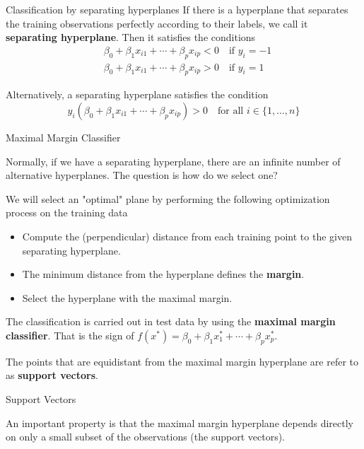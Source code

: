 \documentclass{beamer}
\begin{document}
\begin{frame}{Classification by separating hyperplanes}
	If there is a hyperplane that separates the training observations perfectly according to their labels, we call it {\bf separating hyperplane}.  Then it satisfies the conditions
	\begin{equation*}
		\begin{split}
			&\beta_0 + \beta_1 x_{i1} + \cdots + \beta_p x_{ip}<0  \quad \textrm{if } y_i = -1\\
			&\beta_0 + \beta_1 x_{i1}+ \cdots + \beta_p x_{ip}>0  \quad \textrm{if } y_i =1
		\end{split}
	\end{equation*}

Alternatively, a separating hyperplane satisfies the condition
\begin{equation*}
	y_i \left( \beta_0 + \beta_1 x_{i1} + \cdots + \beta_p x_{ip} \right)  >0  \quad \textrm{for all  } i \in \{1,\ldots,n\}
\end{equation*}
\end{frame}

\begin{frame}{Maximal Margin Classifier}
	
	Normally, if we have a separating hyperplane, there are an infinite number of alternative hyperplanes. The question is how do we select one?
	
	We will select an "optimal" plane by performing the following optimization process on the training data
	
	\begin{itemize}
		\item Compute the (perpendicular) distance from each training point to the given separating hyperplane.
		\item The minimum distance from the hyperplane defines the {\bf margin}.
		\item Select the hyperplane with the maximal margin.
	\end{itemize}
	The classification is carried out in test data by using the {\bf maximal margin classifier}. That is the sign of $f(x^*)= \beta_0 + \beta_1 x_1^* + \cdots + \beta_p x_p^*$. 
	
	The points that are equidistant from the maximal margin hyperplane are refer to as {\bf support vectors}. 
\end{frame}

\begin{frame}{Support Vectors}
	
	An important property is that the maximal margin hyperplane depends directly on only a small subset of the observations (the support vectors).
	
	
\end{frame}
\end{document}
